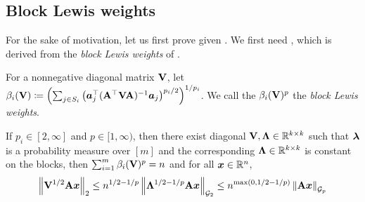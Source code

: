 \documentclass[11pt]{article}
\numberwithin{equation}{section}
\begin{document}
\subsection{Block Lewis weights}
\label{sec:blw_defs_covering}

For the sake of motivation, let us first prove  given . We first need , which is derived from the \textit{block Lewis weights} of \citet{jlls23}.

For a nonnegative diagonal matrix $\mathbf{V}$, let $\beta_i(\mathbf{V}) \coloneqq \left(\sum_{j \in S_i} \left(\bm{a}_j^{\top}(\mathbf{A}^{\top}\mathbf{V}\mathbf{A})^{-1}\bm{a}_j\right)^{p_i/2}\right)^{1/p_i}$. We call the $\beta_i(\mathbf{V})^p$ the \textit{block Lewis weights}.

\begin{lemma}
\label{lemma:block_lewis}
If $p_i \in [2, \infty]$ and $p \in [1, \infty)$, then there exist diagonal $\mathbf{V}, \mathbf{\Lambda} \in \mathbb{R}^{k \times k}$ such that $\bm{\lambda}$ is a probability measure over $[m]$ and the corresponding \(\mathbf{\Lambda}\in\mathbb{R}^{k\times k}\) is constant on the blocks, then
\(
\sum_{i=1}^m \beta_i(\mathbf{V})^p = n
\) and for all $\bm{x}\in\mathbb{R}^n$,
\begin{align*}
    \left\lVert \mathbf{V}^{1/2}\mathbf{A}\bm{x} \right\rVert_2 \le n^{1/2-1/p}\left\lVert \mathbf{\Lambda}^{1/2-1/p}\mathbf{A}\bm{x} \right\rVert_{\mathcal{G}_{2}} \le n^{\max(0,1/2-1/p)}\left\lVert \mathbf{A}\bm{x} \right\rVert_{\mathcal{G}_{p}}
\end{align*}
\end{lemma}
\end{document}
